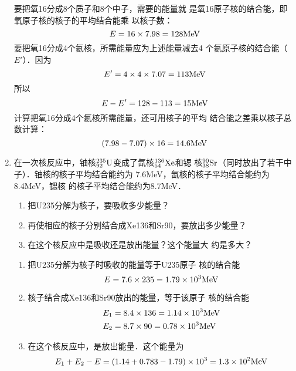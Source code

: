 \begin{enumerate}
\begin{solution}
要把氧16分成8个质子和8个中子，需要的能量就
是氧16原子核的结合能，即氧原子核的核子的平均结合能乘
以核子数：
\[E=16\x7.98=128{\rm MeV}\]
要把氧16分成4个氦核，所需能量应为上述能量减去4
个氦原子核的结合能（$E'$）．因为
\[E'=4\x4\x7.07=113{\rm MeV}\]
所以
\[E-E'=128-113=15{\rm MeV}\]
计算把氧16分成4个氦核所需能量，还可用核子的平均
结合能之差乘以核子总数计算：
\[(7.98-7.07)\x16=14.6{\rm MeV}\]
\end{solution}
\item 在一次核反应中，铀核$\atom{U}{235}{92}$变成了氙核$\atom{Xe}{136}{54}$和锶
核$\atom{Sr}{90}{38}$（同时放出了若干中子）．铀核的核子平均结合能约为
7.6MeV，氙核的核子平均结合能约为8.4MeV，锶核
的核子平均结合能约为8.7MeV．
\begin{enumerate}
    \item 把U235分解为核子，要吸收多少能量？
    \item 再使相应的核子分别结合成Xe136和Sr90，要放出多少能量？
    \item 在这个核反应中是吸收还是放出能量？这个能量大
约是多大？
\end{enumerate}

\begin{solution}
\begin{enumerate}
    \item 把U235分解为核子时吸收的能量等于U235原子
    核的结合能
\[E=7.6\x235=1.79\x10^3{\rm MeV}\]
\item 核子结合成Xe136和Sr90放出的能量，等于该原子
核的结合能
\[\begin{split}
    E_1&=8.4\x136=1.14\x10^3{\rm MeV}\\
E_2&=8.7\x90=0.78\x10^3{\rm MeV}
\end{split}\]
\item 在这个核反应中，是放出能量．这个能量为
\[E_1+E_2-E=(1.14+0.783-1.79)\x 10^3=1.3\x 10^2 {\rm MeV}\]
\end{enumerate}
\end{solution}
\end{enumerate}



